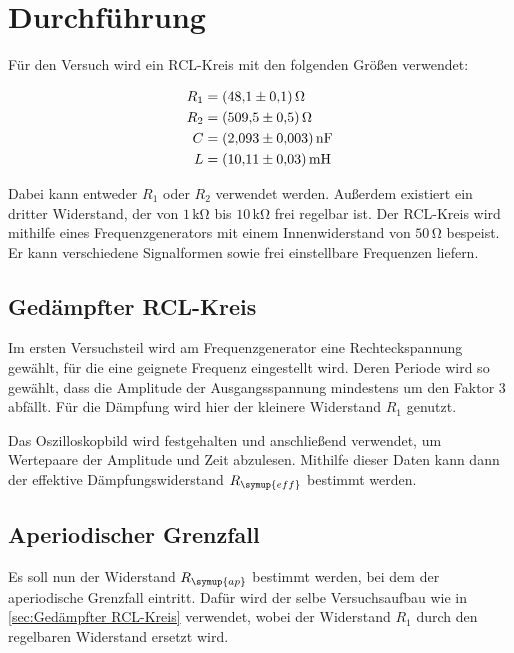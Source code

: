 \section{Durchführung}
\label{sec:Durchführung}

Für den Versuch wird ein RCL-Kreis mit den folgenden Größen verwendet:

\begin{align*}
    R_{1} &= \qty{48.1+-0.1}{\ohm} \\ \notag
    R_{2} &= \qty{509.5+-0.5}{\ohm} \\ \notag
    C &= \qty{2.093+-0.003}{\nano\farad} \\ \notag
    L &= \qty{10.11+-0.03}{\milli\henry} \notag
\end{align*}

Dabei kann entweder $R_{1}$ oder $R_{2}$ verwendet werden.
Außerdem existiert ein dritter Widerstand, der von $1\,\unit{\kilo\ohm}$ bis $10\,\unit{\kilo\ohm}$ frei regelbar ist.
Der RCL-Kreis wird mithilfe eines Frequenzgenerators mit einem Innenwiderstand von $50\,\unit{\ohm}$ bespeist.
Er kann verschiedene Signalformen sowie frei einstellbare Frequenzen liefern.

\subsection{Gedämpfter RCL-Kreis}
\label{sec:Gedämpfter RCL-Kreis}

Im ersten Versuchsteil wird am Frequenzgenerator eine Rechteckspannung gewählt, für die eine geignete Frequenz eingestellt wird.
Deren Periode wird so gewählt, dass die Amplitude der Ausgangsspannung
mindestens um den Faktor 3 abfällt.
Für die Dämpfung wird hier der kleinere Widerstand $R_{1}$ genutzt.

Das Oszilloskopbild wird festgehalten und anschließend verwendet, um Wertepaare der Amplitude und Zeit abzulesen.
Mithilfe dieser Daten kann dann der effektive Dämpfungswiderstand $R_{\symup{eff}}$ bestimmt werden.

\subsection{Aperiodischer Grenzfall}
\label{sec:Aperiodischer Grenzfall Durchführung}

Es soll nun der Widerstand $R_{\symup{ap}}$ bestimmt werden, bei dem der aperiodische Grenzfall eintritt.
Dafür wird der selbe Versuchsaufbau wie in \autoref{sec:Gedämpfter RCL-Kreis} verwendet, wobei der Widerstand $R_{1}$
durch den regelbaren Widerstand ersetzt wird.

